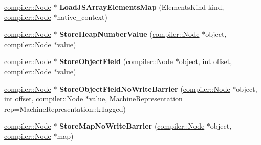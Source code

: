 \begin{DoxyCompactItemize}
\item 
\hyperlink{classv8_1_1internal_1_1compiler_1_1_node}{compiler\+::\+Node} $\ast$ {\bfseries Load\+J\+S\+Array\+Elements\+Map} (Elements\+Kind kind, \hyperlink{classv8_1_1internal_1_1compiler_1_1_node}{compiler\+::\+Node} $\ast$native\+\_\+context)\hypertarget{classv8_1_1internal_1_1_code_stub_assembler_ae96aeb0b2c8d1213472560ecf028dfd2}{}\label{classv8_1_1internal_1_1_code_stub_assembler_ae96aeb0b2c8d1213472560ecf028dfd2}

\item 
\hyperlink{classv8_1_1internal_1_1compiler_1_1_node}{compiler\+::\+Node} $\ast$ {\bfseries Store\+Heap\+Number\+Value} (\hyperlink{classv8_1_1internal_1_1compiler_1_1_node}{compiler\+::\+Node} $\ast$object, \hyperlink{classv8_1_1internal_1_1compiler_1_1_node}{compiler\+::\+Node} $\ast$value)\hypertarget{classv8_1_1internal_1_1_code_stub_assembler_a14a3697ef3f00dc8818964eec05b112c}{}\label{classv8_1_1internal_1_1_code_stub_assembler_a14a3697ef3f00dc8818964eec05b112c}

\item 
\hyperlink{classv8_1_1internal_1_1compiler_1_1_node}{compiler\+::\+Node} $\ast$ {\bfseries Store\+Object\+Field} (\hyperlink{classv8_1_1internal_1_1compiler_1_1_node}{compiler\+::\+Node} $\ast$object, int offset, \hyperlink{classv8_1_1internal_1_1compiler_1_1_node}{compiler\+::\+Node} $\ast$value)\hypertarget{classv8_1_1internal_1_1_code_stub_assembler_a6204745d1fb74cec13f1160cee9afda1}{}\label{classv8_1_1internal_1_1_code_stub_assembler_a6204745d1fb74cec13f1160cee9afda1}

\item 
\hyperlink{classv8_1_1internal_1_1compiler_1_1_node}{compiler\+::\+Node} $\ast$ {\bfseries Store\+Object\+Field\+No\+Write\+Barrier} (\hyperlink{classv8_1_1internal_1_1compiler_1_1_node}{compiler\+::\+Node} $\ast$object, int offset, \hyperlink{classv8_1_1internal_1_1compiler_1_1_node}{compiler\+::\+Node} $\ast$value, Machine\+Representation rep=Machine\+Representation\+::k\+Tagged)\hypertarget{classv8_1_1internal_1_1_code_stub_assembler_ae6a54be3cf11596195eadd5133996e71}{}\label{classv8_1_1internal_1_1_code_stub_assembler_ae6a54be3cf11596195eadd5133996e71}

\item 
\hyperlink{classv8_1_1internal_1_1compiler_1_1_node}{compiler\+::\+Node} $\ast$ {\bfseries Store\+Map\+No\+Write\+Barrier} (\hyperlink{classv8_1_1internal_1_1compiler_1_1_node}{compiler\+::\+Node} $\ast$object, \hyperlink{classv8_1_1internal_1_1compiler_1_1_node}{compiler\+::\+Node} $\ast$map)\hypertarget{classv8_1_1internal_1_1_code_stub_assembler_a79b80e2883bddd13100b0f7917bfc2aa}{}\label{classv8_1_1internal_1_1_code_stub_assembler_a79b80e2883bddd13100b0f7917bfc2aa}


\end{DoxyCompactItemize}
